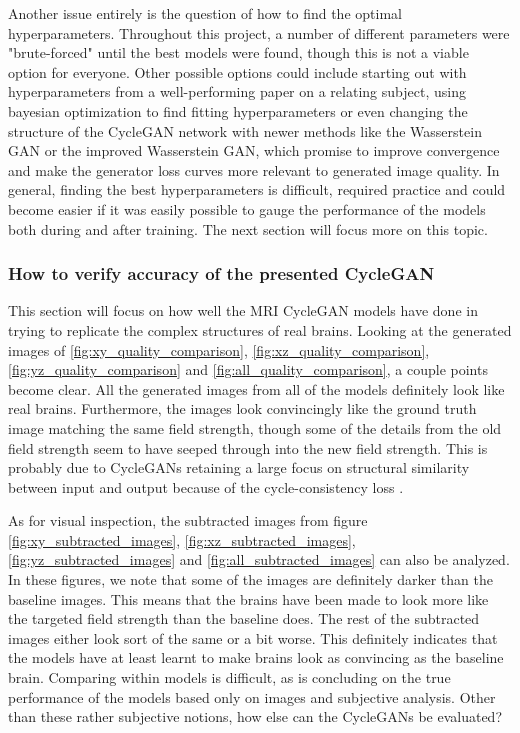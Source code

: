 \documentclass[11pt, fleqn, titlepage]{article}
\newcommand{\1}[1]{\mathds{1}\left[#1\right]}
\begin{document}
Another issue entirely is the question of how to find the optimal hyperparameters. Throughout this project, a number of different parameters were "brute-forced" until the best models were found, though this is not a viable option for everyone. Other possible options could include starting out with hyperparameters from a well-performing paper on a relating subject, using bayesian optimization\cite{bayesian_optimization} to find fitting hyperparameters or even changing the structure of the CycleGAN network with newer methods like the Wasserstein GAN\cite{wasserstein_gan} or the improved Wasserstein GAN\cite{wasserstein_gan_improved}, which promise to improve convergence and make the generator loss curves more relevant to generated image quality. In general, finding the best hyperparameters is difficult, required practice and could become easier if it was easily possible to gauge the performance of the models both during and after training. The next section will focus more on this topic.


\subsubsection{How to verify accuracy of the presented CycleGAN}\label{discuss_measure}
This section will focus on how well the MRI CycleGAN models have done in trying to replicate the complex structures of real brains. Looking at the generated images of \ref{fig:xy_quality_comparison}, \ref{fig:xz_quality_comparison}, \ref{fig:yz_quality_comparison} and \ref{fig:all_quality_comparison}, a couple points become clear. All the generated images from all of the models definitely look like real brains. Furthermore, the images look convincingly like the ground truth image matching the same field strength, though some of the details from the old field strength seem to have seeped through into the new field strength. This is probably due to CycleGANs retaining a large focus on structural similarity between input and output because of the cycle-consistency loss \cite{better_cycles_losses}.

As for visual inspection, the subtracted images from figure \ref{fig:xy_subtracted_images}, \ref{fig:xz_subtracted_images}, \ref{fig:yz_subtracted_images} and \ref{fig:all_subtracted_images} can also be analyzed. In these figures, we note that some of the images are definitely darker than the baseline images. This means that the brains have been made to look more like the targeted field strength than the baseline does. The rest of the subtracted images either look sort of the same or a bit worse. This definitely indicates that the models have at least learnt to make brains look as convincing as the baseline brain. Comparing within models is difficult, as is concluding on the true performance of the models based only on images and subjective analysis. Other than these rather subjective notions, how else can the CycleGANs be evaluated?
\end{document}
